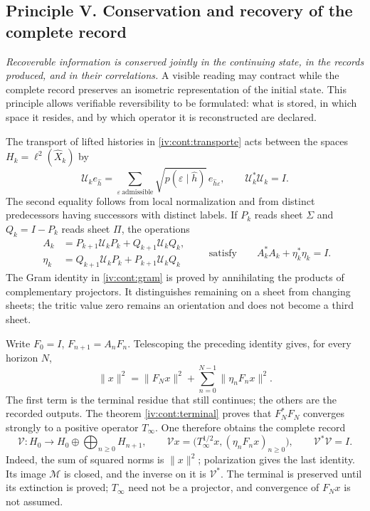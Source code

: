 \subsection*{Principle V. Conservation and recovery of the complete record}
\hypertarget{prinh:conservacion}{}

\emph{Recoverable information is conserved jointly in the continuing
state, in the records produced, and in their correlations.} A
visible reading may contract while the complete record preserves an
isometric representation of the initial state. This principle allows
verifiable reversibility to be formulated: what is stored, in which
space it resides, and by which operator it is reconstructed are declared.

The transport of lifted histories in \cref{iv:cont:transporte} acts
between the spaces \(H_k=\ell^2(\widehat X_k)\) by
\[
 \mathcal U_ke_{\widehat h}=
 \sum_{\varepsilon\ \mathrm{admissible}}
 \sqrt{p(\varepsilon\mid\widehat h)}\,
 e_{\widehat h\varepsilon},\qquad
 \mathcal U_k^*\mathcal U_k=I.
\]
The second equality follows from local normalization and from distinct predecessors
having successors with distinct labels. If \(P_k\) reads sheet
\(\Sigma\) and \(Q_k=I-P_k\) reads sheet \(\Pi\), the operations
\[
 \begin{aligned}
 A_k&=P_{k+1}\mathcal U_kP_k+Q_{k+1}\mathcal U_kQ_k,\\
 \eta_k&=Q_{k+1}\mathcal U_kP_k+P_{k+1}\mathcal U_kQ_k
 \end{aligned}
 \qquad\text{satisfy}\qquad A_k^*A_k+\eta_k^*\eta_k=I.
\]
The Gram identity in \cref{iv:cont:gram} is proved by annihilating the
products of complementary projectors. It distinguishes remaining on a
sheet from changing sheets; the tritic value zero remains an
orientation and does not become a third sheet.

Write \(F_0=I\), \(F_{n+1}=A_nF_n\). Telescoping the
preceding identity gives, for every horizon \(N\),
\[
 \|x\|^2=\|F_Nx\|^2+
                 \sum_{n=0}^{N-1}\|\eta_nF_nx\|^2.
\]
The first term is the terminal residue that still continues; the others
are the recorded outputs. The theorem \cref{iv:cont:terminal} proves
that \(F_N^*F_N\) converges strongly to a positive operator
\(T_\infty\). One therefore obtains the complete record
\[
 \mathcal V:H_0\longrightarrow H_0\oplus
                     \bigoplus_{n\geq0}H_{n+1},\qquad
 \mathcal Vx=\bigl(T_\infty^{1/2}x,
                         (\eta_nF_nx)_{n\geq0}\bigr),
 \qquad\mathcal V^*\mathcal V=I.
\]
Indeed, the sum of squared norms is \(\|x\|^2\);
polarization gives the last identity. Its image \(\mathcal M\) is
closed, and the inverse on it is \(\mathcal V^*\). The terminal is
preserved until its extinction is proved; \(T_\infty\) need not be
a projector, and convergence of \(F_Nx\) is not assumed.

